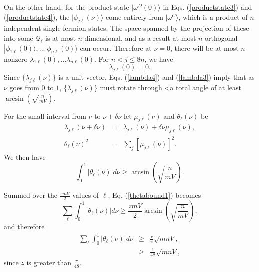 \documentclass[twocolumn,amsmath,amssymb]{revtex4-1}
\begin{document}
On the other hand, for the product state $|\omega^D(0) \rangle $
in Eqs. (\ref{productstate3}) and (\ref{productstate4}),
the $|\phi_{j\ell}(\nu) \rangle $ come entirely from $|\omega^C \rangle $,
which is a product of
$n$ independent single fermion states.
The space spanned by the projection of these 
into some $\mathcal{Q}_\ell$ is at most $n$ dimensional,
and as a result at most
$n$ orthogonal $|\phi_{1\ell}(0) \rangle ,... |\phi_{n\ell}(0) \rangle $ can occur.
Therefore
at $\nu = 0$, there will be at most $n$ nonzero 
$\lambda_{1\ell}(0), ... \lambda_{n\ell}(0)$. For
$n < j \le 8n$, we have
\begin{equation}
\label{lambda3}
\lambda_{j\ell}( 0) = 0.
\end{equation}
Since $\{\lambda_{j\ell}( \nu)\}$ is a unit vector,
Eqs. (\ref{lambda4}) and (\ref{lambda3}) imply that
as $\nu$ goes from $0$ to $1$,
$\{\lambda_{j\ell}( \nu)\}$ 
must rotate through <a total angle of at least $\arcsin(\sqrt{\frac{n}{mV}})$.



For the small interval from $\nu$ to $\nu + \delta \nu$ let
$\mu_{j\ell}(\nu)$ and $\theta_{\ell}(\nu)$ be 
\begin{subequations}
\begin{eqnarray}
\label{mudeltat1}
\lambda_{j\ell}(\nu + \delta \nu) & = & \lambda_{j\ell}( \nu ) + \delta \nu \mu_{j\ell}(\nu), \\
\label{thetaoft1}
\theta_{\ell}( \nu)^2 & = & \sum_j [ \mu_{j\ell}(\nu)]^2. 
\end{eqnarray}
\end{subequations}
We then have
\begin{equation}
\label{thetabound1}
\int_0^1 | \theta_{\ell}(\nu)| d \nu \ge \arcsin(\sqrt{\frac{n}{mV}}).
\end{equation}

Summed over the $\frac{zmV}{2}$ values of $\ell$,
Eq. (\ref{thetabound1}) becomes
\begin{equation}
\label{thetaboundsum2}
\sum_{\ell} \int_0^1 | \theta_{\ell}(\nu)| d \nu  \ge 
\frac{z m V}{2} \arcsin(\sqrt{\frac{n}{mV}}),
\end{equation}
and therefore
\begin{subequations}
\begin{eqnarray}
\label{thetaboundsum3}
\sum_{\ell} \int_0^1 | \theta_{\ell}(\nu)| d \nu
&\ge& \frac{r}{\pi} \sqrt{mnV}, \\
\label{thetaboundsum4}
& \ge& \frac{1}{48} \sqrt{mnV},
\end{eqnarray}
\end{subequations}
since $z$ is greater than $\frac{\pi}{48}$.
\end{document}
